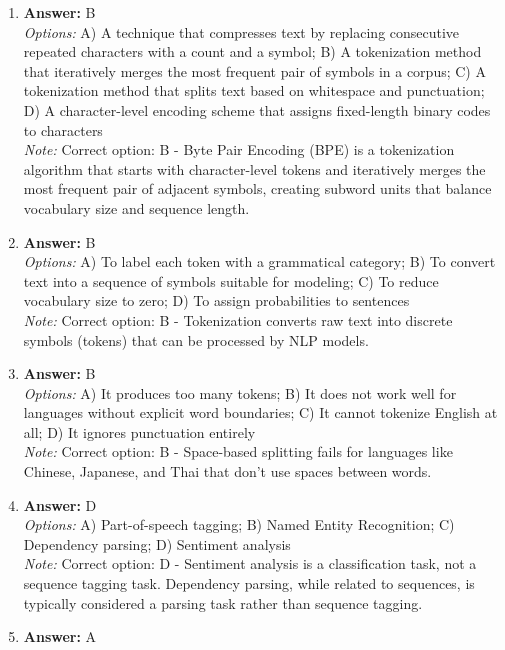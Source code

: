 \documentclass[12pt]{article}
\begin{document}
\begin{enumerate}[label=Q\arabic*.]
\\ \textit{Note:} Correct option: A - Semantic Role Labeling (SRL) identifies predicates (verbs) and labels the semantic roles of their arguments, such as agent (who does the action), theme (what is affected), location (where), etc.
\item \textbf{Answer:} B
\\ \textit{Options:} A) A technique that compresses text by replacing consecutive repeated characters with a count and a symbol; B) A tokenization method that iteratively merges the most frequent pair of symbols in a corpus; C) A tokenization method that splits text based on whitespace and punctuation; D) A character-level encoding scheme that assigns fixed-length binary codes to characters
\\ \textit{Note:} Correct option: B - Byte Pair Encoding (BPE) is a tokenization algorithm that starts with character-level tokens and iteratively merges the most frequent pair of adjacent symbols, creating subword units that balance vocabulary size and sequence length.
\item \textbf{Answer:} B
\\ \textit{Options:} A) To label each token with a grammatical category; B) To convert text into a sequence of symbols suitable for modeling; C) To reduce vocabulary size to zero; D) To assign probabilities to sentences
\\ \textit{Note:} Correct option: B - Tokenization converts raw text into discrete symbols (tokens) that can be processed by NLP models.
\item \textbf{Answer:} B
\\ \textit{Options:} A) It produces too many tokens; B) It does not work well for languages without explicit word boundaries; C) It cannot tokenize English at all; D) It ignores punctuation entirely
\\ \textit{Note:} Correct option: B - Space-based splitting fails for languages like Chinese, Japanese, and Thai that don't use spaces between words.
\item \textbf{Answer:} D
\\ \textit{Options:} A) Part-of-speech tagging; B) Named Entity Recognition; C) Dependency parsing; D) Sentiment analysis
\\ \textit{Note:} Correct option: D - Sentiment analysis is a classification task, not a sequence tagging task. Dependency parsing, while related to sequences, is typically considered a parsing task rather than sequence tagging.
\item \textbf{Answer:} A

\end{enumerate}
\end{document}
